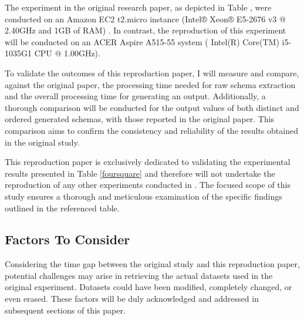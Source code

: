 \documentclass[sigconf, nonacm]{acmart}
\begin{document}
The experiment in the original research paper, as depicted in Table \cite{ccelikten2016modeling}, were conducted on an Amazon EC2 t2.micro instance (Intel® Xeon® E5-2676 v3 @ 2.40GHz and 1GB of RAM) \cite{frozza2018approach}. In contrast, the reproduction of this experiment will be conducted on an ACER Aspire A515-55 system ( Intel(R) Core(TM) i5-1035G1 CPU @ 1.00GHz).

To validate the outcomes of this reproduction paper, I will measure and compare, against the original paper, the processing time needed for raw schema extraction and the overall processing time for generating an output. Additionally, a thorough comparison will be conducted for the output values of both distinct and ordered generated schemas, with those reported in the original paper. This comparison aims to confirm the consistency and reliability of the results obtained in the original study.

This reproduction paper is exclusively dedicated to validating the experimental results presented in Table \ref{foursquare} and therefore will not undertake the reproduction of any other experiments conducted in \cite{frozza2018approach}. The focused scope of this study ensures a thorough and meticulous examination of the specific findings outlined in the referenced table.

\subsection{Factors To Consider}
Considering the time gap between the original study and this reproduction paper, potential challenges may arise in retrieving the actual datasets used in the original experiment. Datasets could have been modified, completely changed, or even erased. These factors will be duly acknowledged and addressed in subsequent sections of this paper.



\end{document}
